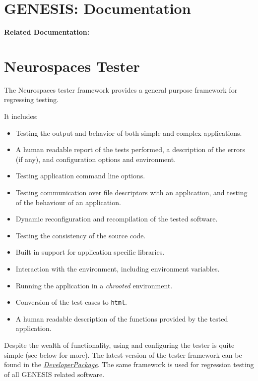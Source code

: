 \documentclass[12pt]{article}
\begin{document}
\section*{GENESIS: Documentation}

{\bf Related Documentation:}

\section*{Neurospaces Tester}

The Neurospaces tester framework provides a general purpose framework for regressing testing.

It includes:
\begin{itemize}
\item Testing the output and behavior of both simple and complex applications.
\item A human readable report of the tests performed, a description of the errors (if any), and configuration options and environment.
\item Testing application command line options.
\item Testing communication over file descriptors with an application, and testing of the behaviour of an application.
\item Dynamic reconfiguration and recompilation of the tested software.
\item Testing the consistency of the source code.
\item Built in support for application specific libraries.
\item Interaction with the environment, including environment variables.
\item Running the application in a {\it chrooted} environment.
\item Conversion of the test cases to {\tt html}.
\item A human readable description of the functions provided by the
  tested application.
\end{itemize}

Despite the wealth of functionality, using and configuring the tester
is quite simple (see below for more). The latest version of the tester
framework can be found in the
\href{../developer-package/developer-package.tex}{\it
  DeveloperPackage}. The same framework is used for regression testing
of all GENESIS related software.
\end{document}
